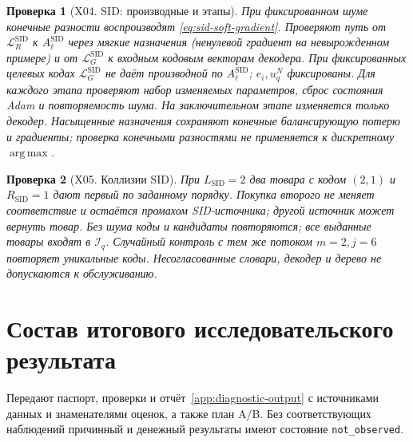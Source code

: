 \documentclass[12pt,a4paper]{article}
\newcommand{\code}[1]{{\ttfamily\small\nolinkurl{#1}}}
\DeclareMathOperator*{\argmax}{arg\,max}
\theoremstyle{plainru}
\newtheorem{testcase}{Проверка}[section]
\begin{document}
\begin{testcase}[X04. SID: производные и этапы]
При фиксированном шуме конечные разности воспроизводят
\eqref{eq:sid-soft-gradient}. Проверяют путь от $\mathcal L_R^{\mathrm{SID}}$
к $A_\ell^{\mathrm{SID}}$ через мягкие назначения (ненулевой градиент
на невырожденном примере) и от
$\mathcal L_G^{\mathrm{SID}}$ к входным кодовым векторам декодера.
При фиксированных целевых кодах $\mathcal L_G^{\mathrm{SID}}$ не даёт
производной по $A_\ell^{\mathrm{SID}}$; $e_i,u_q^N$ фиксированы.
Для каждого этапа проверяют набор изменяемых параметров, сброс состояния
Adam и повторяемость шума. На заключительном этапе изменяется только декодер.
Насыщенные назначения сохраняют конечные балансирующую потерю и градиенты;
проверка конечными разностями не применяется к дискретному $\argmax$.
\end{testcase}

\begin{testcase}[X05. Коллизии SID]
При $L_{\mathrm{SID}}=2$ два товара с кодом $(2,1)$
и $R_{\mathrm{SID}}=1$ дают первый
по заданному порядку. Покупка второго не меняет соответствие
и остаётся промахом SID-источника; другой источник может вернуть товар.
Без шума коды и кандидаты повторяются; все выданные товары входят в $\mathcal I_q$.
Случайный контроль с тем же потоком $m=2,j=6$ повторяет уникальные коды.
Несогласованные словари, декодер и дерево не допускаются к обслуживанию.
\end{testcase}

\section{Состав итогового исследовательского результата}\label{app:deliverables}

Передают паспорт, проверки и отчёт~\ref{app:diagnostic-output}
с источниками данных и знаменателями оценок, а также план A/B.
Без соответствующих наблюдений причинный и денежный результаты
имеют состояние \code{not_observed}.
\end{document}

